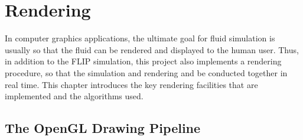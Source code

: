 \chapter{Rendering}
\label{chapter render}
In computer graphics applications, the ultimate goal for fluid simulation is usually so that the fluid can be rendered and displayed to the human user. Thus, in addition to the FLIP simulation, this project also implements a rendering procedure, so that the simulation and rendering and be conducted together in real time. This chapter introduces the key rendering facilities that are implemented and the algorithms used.


\section{The OpenGL Drawing Pipeline}
\label{section opengl}

